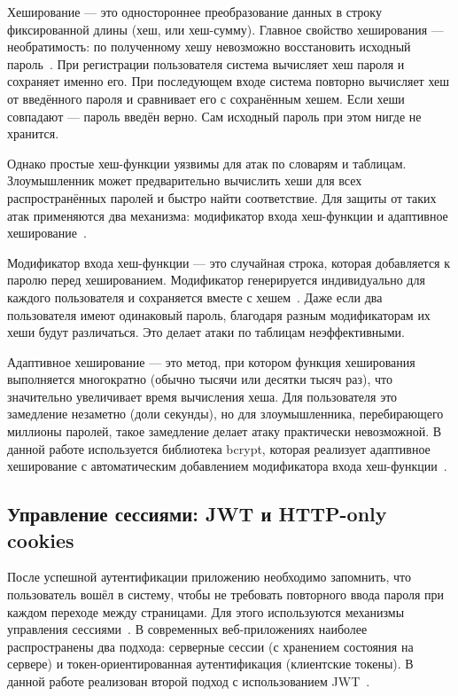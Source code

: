 Хеширование — это одностороннее преобразование данных в строку фиксированной длины (хеш, или хеш-сумму). Главное свойство хеширования — необратимость: по полученному хешу невозможно восстановить исходный пароль~\cite{bcryptDocs}. При регистрации пользователя система вычисляет хеш пароля и сохраняет именно его. При последующем входе система повторно вычисляет хеш от введённого пароля и сравнивает его с сохранённым хешем. Если хеши совпадают — пароль введён верно. Сам исходный пароль при этом нигде не хранится.

Однако простые хеш-функции уязвимы для атак по словарям и таблицам. Злоумышленник может предварительно вычислить хеши для всех распространённых паролей и быстро найти соответствие. Для защиты от таких атак применяются два механизма: модификатор входа хеш-функции и адаптивное хеширование~\cite{bcryptDocs}.

Модификатор входа хеш-функции — это случайная строка, которая добавляется к паролю перед хешированием. Модификатор генерируется индивидуально для каждого пользователя и сохраняется вместе с хешем~\cite{owaspPasswords}. Даже если два пользователя имеют одинаковый пароль, благодаря разным модификаторам их хеши будут различаться. Это делает атаки по таблицам неэффективными.

Адаптивное хеширование — это метод, при котором функция хеширования выполняется многократно (обычно тысячи или десятки тысяч раз), что значительно увеличивает время вычисления хеша. Для пользователя это замедление незаметно (доли секунды), но для злоумышленника, перебирающего миллионы паролей, такое замедление делает атаку практически невозможной. В данной работе используется библиотека bcrypt, которая реализует адаптивное хеширование с автоматическим добавлением модификатора входа хеш-функции~\cite{bcryptDocs}.

\subsection{Управление сессиями: JWT и HTTP-only cookies}

После успешной аутентификации приложению необходимо запомнить, что пользователь вошёл в систему, чтобы не требовать повторного ввода пароля при каждом переходе между страницами. Для этого используются механизмы управления сессиями~\cite{jwtIntro}. В современных веб-приложениях наиболее распространены два подхода: серверные сессии (с хранением состояния на сервере) и токен-ориентированная аутентификация (клиентские токены). В данной работе реализован второй подход с использованием JWT~\cite{bookJWT}.

